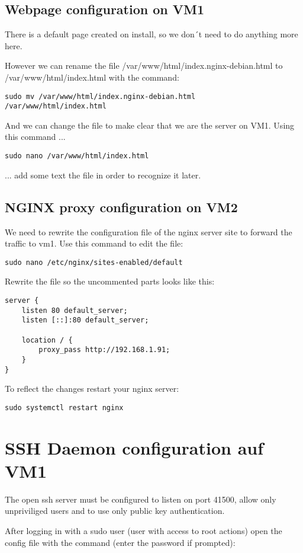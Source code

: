 \documentclass[10pt,a4paper]{article}
\begin{document}
\subsection{Webpage configuration on VM1}
There is a default page created on install, so we don´t need to do anything more here.

However we can rename the file /var/www/html/index.nginx-debian.html to /var/www/html/index.html with the command:
\begin{verbatim}
sudo mv /var/www/html/index.nginx-debian.html 
/var/www/html/index.html
\end{verbatim}

And we can change the file to make clear that we are the server on VM1. Using this command ...
\begin{verbatim}
sudo nano /var/www/html/index.html
\end{verbatim}

... add some text the file in order to recognize it later.

\subsection{NGINX proxy configuration on VM2}
We need to rewrite the configuration file of the nginx server site to forward the traffic to vm1. Use this command to edit the file:
\begin{verbatim}
sudo nano /etc/nginx/sites-enabled/default
\end{verbatim}

Rewrite the file so the uncommented parts looks like this:
\begin{verbatim}
server {
	listen 80 default_server;
	listen [::]:80 default_server;
	
	location / {
		proxy_pass http://192.168.1.91;
	}
}
\end{verbatim}

To reflect the changes restart your nginx server:
\begin{verbatim}
sudo systemctl restart nginx
\end{verbatim}

\newpage
\section{SSH Daemon configuration auf VM1}
The open ssh server must be configured to listen on port 41500, allow only unpriviliged users and to use only public key authentication.

After logging in with a sudo user (user with access to root actions) open the config file with the command (enter the password if prompted):
\end{document}

